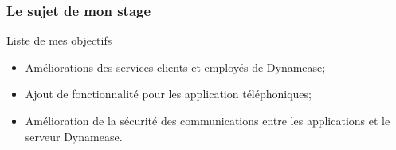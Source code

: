 \begin{frame}
	\frametitle{Le sujet de mon stage}

	\begin{block}{Liste de mes objectifs}
	 \begin{itemize}
	  \item Améliorations des services clients et employés de Dynamease;
      \item Ajout de fonctionnalité pour les application téléphoniques;
	  \item Amélioration de la sécurité des communications entre les applications et le serveur Dynamease.
	 \end{itemize}
	\end{block}

\end{frame}


